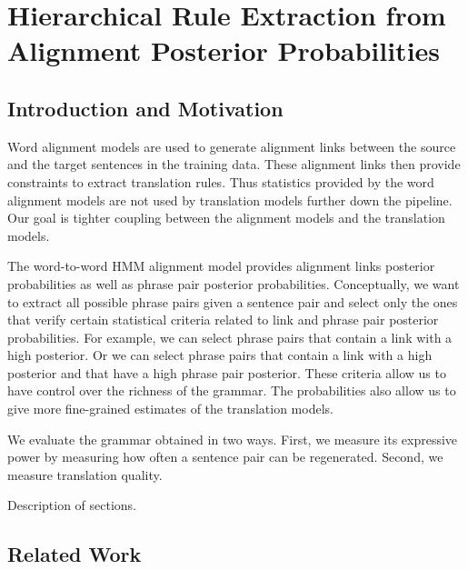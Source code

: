 \chapter{Hierarchical Rule Extraction from Alignment Posterior Probabilities}

\section{Introduction and Motivation}

Word alignment models are used to generate alignment links between
the source and the target sentences in the training data. These
alignment links then provide constraints to extract translation
rules. Thus statistics provided by the word alignment models are
not used by translation models further down the pipeline.
Our goal is tighter coupling between the alignment models and the
translation models.

The word-to-word HMM alignment model provides alignment links
posterior probabilities as well as phrase pair posterior
probabilities. Conceptually, we want to extract all possible phrase pairs given
a sentence pair and select only the ones that verify certain statistical
criteria related to link and phrase pair posterior probabilities. For
example, we can select phrase pairs that contain a link with a high posterior.
Or we can select phrase pairs that contain a link with a high posterior
and that have a high phrase pair posterior. These criteria allow us
to have control over the richness of the grammar. The probabilities
also allow us to give more fine-grained estimates of the translation
models.

We evaluate the grammar obtained in two ways. First, we measure
its expressive power by measuring how often a sentence pair
can be regenerated. Second, we measure translation quality.

Description of sections.

\section{Related Work}
